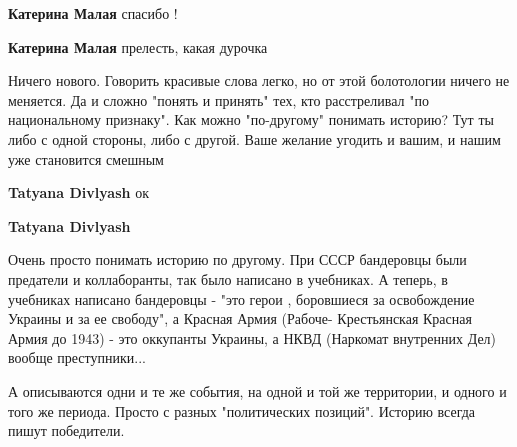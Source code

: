 \begin{itemize}
\begin{itemize}
\textbf{Катерина Малая} спасибо !

 
\textbf{Катерина Малая} прелесть, какая дурочка
\end{itemize}

 

Ничего нового. Говорить красивые слова легко, но от этой болотологии ничего не
меняется. Да и сложно "понять и принять" тех, кто расстреливал "по
национальному признаку". Как можно "по-другому" понимать историю? Тут ты либо с
одной стороны, либо с другой. Ваше желание угодить и вашим, и нашим уже
становится смешным

\begin{itemize}
 
\textbf{Tatyana Divlyash} ок

 
\textbf{Tatyana Divlyash} 

Очень просто понимать историю по другому. При СССР бандеровцы были предатели и
коллаборанты, так было написано в учебниках. А теперь, в учебниках написано
бандеровцы - "это герои , боровшиеся за освобождение Украины и за ее свободу",
а Красная Армия (Рабоче- Крестьянская Красная Армия до 1943) - это оккупанты
Украины, а НКВД (Наркомат внутренних Дел) вообще преступники... 

А описываются одни и те же события, на одной и той же территории, и одного и
того же периода. Просто с разных "политических позиций". Историю всегда пишут
победители. 


\end{itemize}
\end{itemize}
